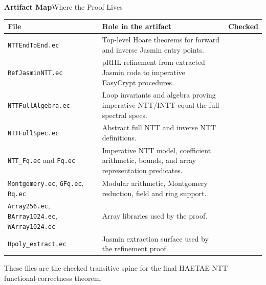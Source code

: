 \documentclass[10pt,aspectratio=1610,compress,dvipsnames]{beamer}
\newcommand{\cmark}{\textcolor{green!55!black}{\ding{51}}}
\newcommand{\ec}[1]{\texttt{#1}}
\begin{document}
\begin{frame}{\bfseries Artifact Map}{Where the Proof Lives}
\begin{center}
\scriptsize\renewcommand{\arraystretch}{1.16}
\setlength{\tabcolsep}{3pt}
\begin{tabular}{p{3.45cm}p{8.05cm}c}
\toprule[1.2pt]
\textbf{File} & \textbf{Role in the artifact} & \textbf{Checked} \\
\midrule
\ec{NTTEndToEnd.ec} & Top-level Hoare theorems for forward and inverse Jasmin entry points. & \cmark \\
\ec{RefJasminNTT.ec} & pRHL refinement from extracted Jasmin code to imperative EasyCrypt procedures. & \cmark \\
\ec{NTTFullAlgebra.ec} & Loop invariants and algebra proving imperative NTT/INTT equal the full spectral specs. & \cmark \\
\ec{NTTFullSpec.ec} & Abstract full NTT and inverse NTT definitions. & \cmark \\
\ec{NTT\_Fq.ec} and \ec{Fq.ec} & Imperative NTT model, coefficient arithmetic, bounds, and array representation predicates. & \cmark \\
\ec{Montgomery.ec}, \ec{GFq.ec}, \ec{Rq.ec} & Modular arithmetic, Montgomery reduction, field and ring support. & \cmark \\
\ec{Array256.ec}, \ec{BArray1024.ec}, \ec{WArray1024.ec} & Array libraries used by the proof. & \cmark \\
\ec{Hpoly\_extract.ec} & Jasmin extraction surface used by the refinement proof. & \cmark \\
\bottomrule[1.2pt]
\end{tabular}
\end{center}
\vspace{3pt}
\begin{center}
\scriptsize
These files are the checked transitive spine for the final HAETAE NTT
functional-correctness theorem.
\end{center}
\end{frame}
\end{document}
